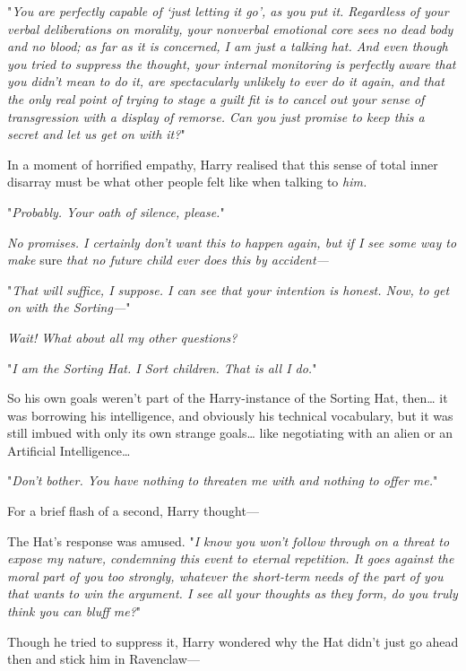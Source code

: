 "\emph{You are perfectly capable of `just letting it go', as you put it. 
Regardless of your verbal deliberations on morality, your nonverbal emotional 
core sees no dead body and no blood; as far as it is concerned, I am just a 
talking hat. And even though you tried to suppress the thought, your internal 
monitoring is perfectly aware that you didn't mean to do it, are spectacularly 
unlikely to ever do it again, and that the only real point of trying to stage a 
guilt fit is to cancel out your sense of transgression with a display of 
remorse. Can you just promise to keep this a secret and let us get on with it?}"

In a moment of horrified empathy, Harry realised that this sense of total inner 
disarray must be what other people felt like when talking to \emph{him.}

"\emph{Probably. Your oath of silence, please.}"

\emph{No promises. I certainly don't want this to happen again, but if I see 
some way to make} sure \emph{that no future child ever does this by accident---}

"\emph{That will suffice, I suppose. I can see that your intention is honest. 
Now, to get on with the Sorting---}"

\emph{Wait! What about all my other questions?}

"\emph{I am the Sorting Hat. I Sort children. That is all I do.}"

So his own goals weren't part of the Harry-instance of the Sorting Hat, 
then{\ldots} it was borrowing his intelligence, and obviously his technical 
vocabulary, but it was still imbued with only its own strange goals{\ldots} 
like negotiating with an alien or an Artificial Intelligence{\ldots}

"\emph{Don't bother. You have nothing to threaten me with and nothing to offer 
me.}"

For a brief flash of a second, Harry thought---

The Hat's response was amused. "\emph{I know you won't follow through on a 
threat to expose my nature, condemning this event to eternal repetition. It 
goes against the moral part of you too strongly, whatever the short-term needs 
of the part of you that wants to win the argument. I see all your thoughts as 
they form, do you truly think you can bluff me?}"

Though he tried to suppress it, Harry wondered why the Hat didn't just go ahead 
then and stick him in Ravenclaw---

